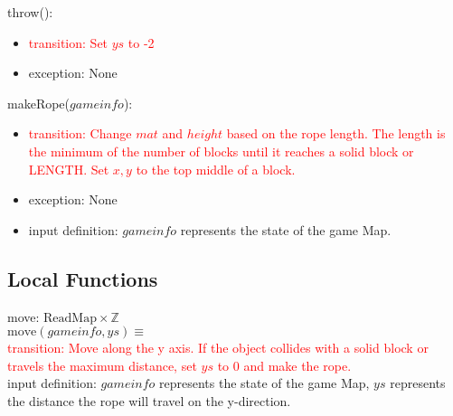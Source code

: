\documentclass[12pt]{article}
\newcommand{\Implies}{\Rightarrow}
\newcommand{\m}[1]{\mbox{#1}}
\begin{document}
\noindent throw():
\begin{itemize}
    \item \textcolor{red}{transition: Set $ys$ to -2}
    \item exception: None
\end{itemize}

\noindent makeRope($gameinfo$):
\begin{itemize}
    \item \textcolor{red}{transition: Change $mat$ and $height$ based on the rope length. The length is the minimum of the number of blocks until it reaches a solid block or LENGTH. Set $x, y$ to the top middle of a block.}
    \item exception: None
    \item input definition: $gameinfo$ represents the state of the game Map.
\end{itemize}

\subsection*{Local Functions}

\noindent move: $\m{ReadMap} \times \mathbb{Z}$\\
$\m{move}(gameinfo, ys) \equiv$\\
\textcolor{red}{transition: Move along the y axis. If the object collides with a solid block or travels the maximum distance, set $ys$ to 0 and make the rope.}\\
input definition: $gameinfo$ represents the state of the game Map, $ys$ represents the distance the rope will travel on the y-direction.\\

\end{document}
